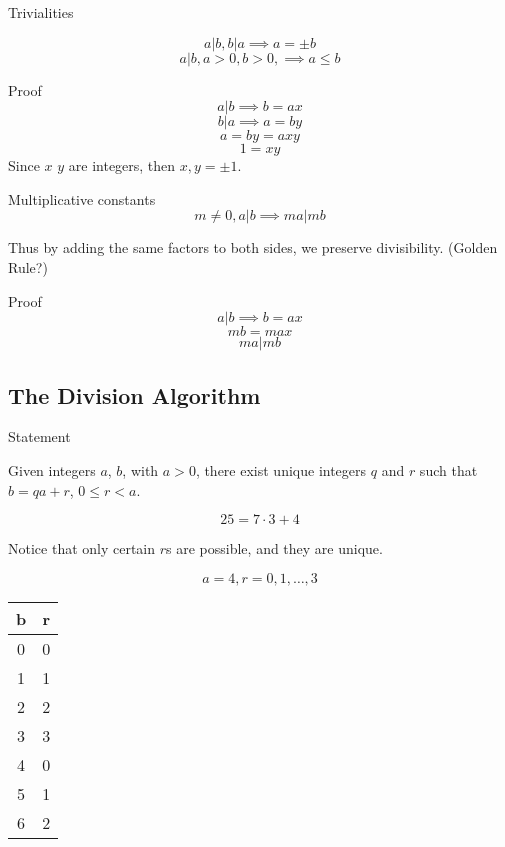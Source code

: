 \documentclass{beamer}
\begin{document}
\begin{frame}{Trivialities}

  $$a|b, b|a \implies a = \pm b$$
  $$a|b, a> 0, b>0, \implies a \le b$$
  
\end{frame}

\begin{frame}{Proof}
  $$a|b \implies b = ax$$
  $$b|a \implies a = by$$
  $$a = by = axy$$
  $$1 = xy$$
  Since $x$ $y$ are integers, then $x, y = \pm 1$.
\end{frame}
  
\begin{frame}{Multiplicative constants}
  $$m \ne 0, a|b \implies ma | mb$$
  
  Thus by adding the same factors to both sides, we preserve
  divisibility. (Golden Rule?)

\end{frame}

\begin{frame}{Proof}
  $$a|b \implies b = ax$$
  $$mb =max$$
  $$ma | mb$$
\end{frame}

\subsection{The Division Algorithm}

\begin{frame}{Statement}

Given integers $a$, $b$, with $a > 0$, there exist unique integers $q$
and $r$ such that $b = qa + r$, $0 \le r < a$.

$$25 = 7 \cdot 3 + 4$$
\end{frame}

\begin{frame}
Notice that only certain $r$s are possible, and they are unique.

$$a = 4, r = 0, 1, \ldots, 3$$

\begin{center}
  \begin{tabular}{c|c}
    b & r \\
    \hline
    0 & 0 \\
    1 & 1 \\
    2 & 2 \\
    3 & 3 \\
    4 & 0 \\
    5 & 1 \\
    6 & 2 \\
  \end{tabular}
\end{center}
\end{frame}
\end{document}
